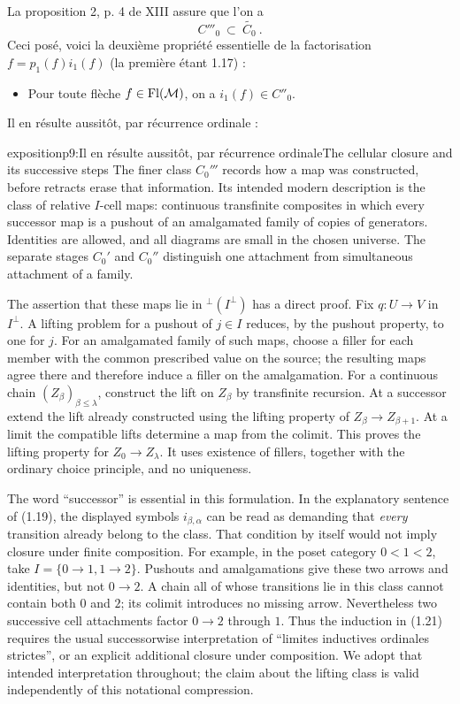 La proposition 2, p. 4 de XIII assure que l'on a
\[
C'''_0 \ \subset \ \widetilde{C_0} \ .
\]
Ceci posé, voici la deuxième propriété essentielle de la factorisation $f = p_1(f)i_1(f)$ (la première étant 1.17) :

\begin{itemize}[leftmargin=5em, labelwidth=4em, labelsep=1em, align=left]
\item[(1.20)] \qquad\qquad Pour toute flèche $f \in \mathrm{Fl}(\mathcal{M})$, on a $i_1(f) \in C''_0$.
\end{itemize}

Il en résulte aussitôt, par récurrence ordinale :

\begin{dcomment}{exposition}{p9:Il en résulte aussitôt, par récurrence ordinale}{The cellular closure and its successive steps}
The finer class $C_0'''$ records how a map was constructed, before retracts erase that information. Its intended modern description is the class of relative $I$-cell maps: continuous transfinite composites in which every successor map is a pushout of an amalgamated family of copies of generators. Identities are allowed, and all diagrams are small in the chosen universe. The separate stages $C_0'$ and $C_0''$ distinguish one attachment from simultaneous attachment of a family.

The assertion that these maps lie in ${}^{\perp}(I^\perp)$ has a direct proof. Fix $q:U\to V$ in $I^\perp$. A lifting problem for a pushout of $j\in I$ reduces, by the pushout property, to one for $j$. For an amalgamated family of such maps, choose a filler for each member with the common prescribed value on the source; the resulting maps agree there and therefore induce a filler on the amalgamation. For a continuous chain $(Z_\beta)_{\beta\leq\lambda}$, construct the lift on $Z_\beta$ by transfinite recursion. At a successor extend the lift already constructed using the lifting property of $Z_\beta\to Z_{\beta+1}$. At a limit the compatible lifts determine a map from the colimit. This proves the lifting property for $Z_0\to Z_\lambda$. It uses existence of fillers, together with the ordinary choice principle, and no uniqueness.

The word ``successor'' is essential in this formulation. In the explanatory sentence of (1.19), the displayed symbols $i_{\beta,\alpha}$ can be read as demanding that \emph{every} transition already belong to the class. That condition by itself would not imply closure under finite composition. For example, in the poset category $0<1<2$, take $I=\{0\to1,1\to2\}$. Pushouts and amalgamations give these two arrows and identities, but not $0\to2$. A chain all of whose transitions lie in this class cannot contain both $0$ and $2$; its colimit introduces no missing arrow. Nevertheless two successive cell attachments factor $0\to2$ through $1$. Thus the induction in (1.21) requires the usual successorwise interpretation of ``limites inductives ordinales strictes'', or an explicit additional closure under composition. We adopt that intended interpretation throughout; the claim about the lifting class is valid independently of this notational compression.
\end{dcomment}


